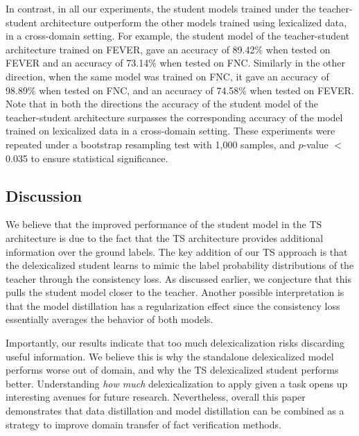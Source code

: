 In contrast, in all our experiments, the student models trained under the teacher-student architecture outperform the other models trained using lexicalized data, in a cross-domain setting. For example, the student model of the teacher-student architecture trained on FEVER, gave an accuracy of 89.42\% when tested on FEVER and an accuracy of 73.14\% when tested on FNC. Similarly in the other direction, when the same model was trained on FNC, it gave an accuracy of 98.89\% when tested on FNC, and an accuracy of 74.58\% when tested on FEVER. Note that in both the directions the accuracy of the student model of the teacher-student architecture surpasses the corresponding accuracy of the model trained on lexicalized data in a cross-domain setting.
These experiments were repeated under a bootstrap resampling test with 1,000 samples, and $p$-value $<$ 0.035 to ensure statistical significance.




\subsection{Discussion}

We believe that the improved performance of the student model in the TS architecture is due to the fact that the TS architecture provides additional information over the ground labels. The key addition of our TS approach is that the delexicalized student learns to mimic the label probability distributions of the teacher through the consistency loss. As discussed earlier, we conjecture that this pulls the student model closer to the teacher. Another possible interpretation is that the model distillation has a regularization effect since the consistency loss essentially averages the behavior of both models.

Importantly, our results indicate that too much delexicalization risks discarding useful information. We believe this is why the standalone delexicalized model performs worse out of domain, and why the TS delexicalized student performs better.
Understanding {\em how much} delexicalization to apply given a task opens up interesting avenues for future research.
Nevertheless, overall this paper demonstrates that data distillation and model distillation can be combined as a strategy to improve domain transfer of fact verification methods.

